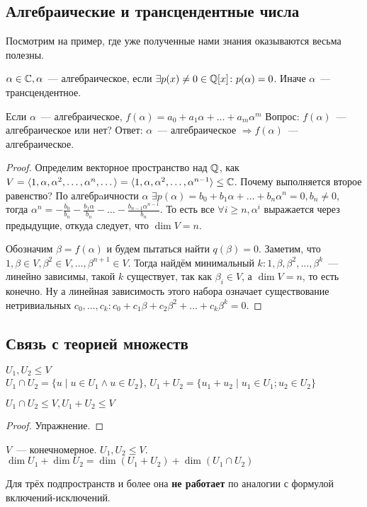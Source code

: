 \subsection{Алгебраические и трансцендентные числа}
\begin{motivation}
    Посмотрим на пример, где уже полученные нами знания оказываются весьма полезны.
\end{motivation} 
\begin{definition}
$\alpha\in\mathbb{C}, \alpha$~--- алгебраическое, если $\exists p(x)\not=0\in\mathbb{Q}[x] \colon p(\alpha)=0$.
Иначе $\alpha$~--- трансцендентное.
\end{definition}
Если $\alpha$~--- алгебраическое, $f(\alpha) = a_0 + a_1\alpha + \dots + a_m\alpha^m$
Вопрос: $f(\alpha)$~--- алгебраическое или нет?
Ответ:
$\alpha$~--- алгебраическое $\Rightarrow f(\alpha)$~--- алгебраическое.
\begin{proof}
    Определим векторное пространство над $\mathbb{Q}$, как 
    $V = \langle1, \alpha, \alpha^2,\dots,\alpha^n,\dots\rangle =
    \langle1, \alpha, \alpha^2,\dots,\alpha^{n-1}\rangle \le \mathbb{C}$.
    Почему выполняется второе равенство?
    По алгебрaичности $\alpha$ $\exists p(\alpha) = b_0+b_1\alpha+\dots+b_n\alpha^n = 0, b_n\not=0$, тогда
    $\alpha^n = -\frac{b_0}{b_n} - \frac{b_1\alpha}{b_n} - \dots - \frac{b_{n-1}\alpha^{n-1}}{b_n}$.
    То есть все $\forall i \ge n, \alpha^i$ выражается через предыдущие, откуда следует, что $\dim V = n$.

    Обозначим $\beta = f(\alpha)$ и будем пытаться найти $q(\beta)=0$.
    Заметим, что $1, \beta\in V, \beta^2\in V,\dots,\beta^{n + 1}\in V$. 
    Тогда найдём минимальный $k: 1,\beta,\beta^2,\dots,\beta^k$~--- линейно зависимы, такой $k$ существует,
    так как $\beta_i \in V$, а $\dim V = n$, то есть конечно.
    Ну а линейная зависимость этого набора означает существование нетривиальных 
    $c_0,\dots, c_k\colon c_0 + c_1\beta + c_2\beta^2 + \dots + c_k\beta^k=0$.
\end{proof}
\subsection{Связь с теорией множеств}
\begin{definition}
    $U_1, U_2\leq V$\\
    $U_1\cap U_2 = \{u \mid u\in U_1 \land u\in U_2\}$,
    $U_1+U_2 = \{u_1+u_2\mid u_1\in U_1; u_2\in U_2\}$
\end{definition}
\begin{statement}
    $U_1\cap U_2 \le V, U_1 + U_2 \le V$
\end{statement}
\begin{proof}
    Упражнение.
\end{proof}
\begin{theorem}
$V$~--- конечномерное. $U_1, U_2\leq V$. 
$\dim U_1 + \dim U_2 = \dim(U_1+U_2) + \dim(U_1\cap U_2)$
\end{theorem}
\begin{remark}
Для трёх подпространств и более она \textbf{не работает} по аналогии с формулой включений-исключений.
\end{remark}
